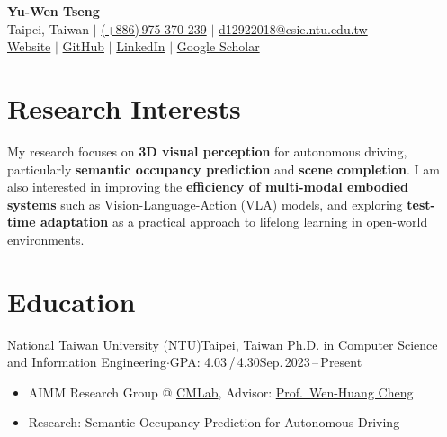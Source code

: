 \documentclass[10pt, a4paper]{article}
\begin{document}
\begin{center}
    {\LARGE\bfseries\color{primary} Yu-Wen Tseng}\vspace{4pt}\\
    {\small\color{lightgray}%
        \enspace Taipei, Taiwan \quad$\vert$\quad
        \enspace\href{tel:+886975370239}{(+886)\,975-370-239} \quad$\vert$\quad
        \enspace\href{mailto:d12922018@csie.ntu.edu.tw}{d12922018@csie.ntu.edu.tw}%
    }\vspace{2pt}\\
    {\small\color{lightgray}%
        \enspace\href{https://ywt0209.github.io}{Website} \quad$\vert$\quad
        \enspace\href{https://github.com/ywt0209}{GitHub} \quad$\vert$\quad
        \enspace\href{https://www.linkedin.com/in/yu-wen-tseng-840586343/}{LinkedIn} \quad$\vert$\quad
        \enspace\href{https://scholar.google.com/citations?user=3NGcUfcAAAAJ&hl=zh-TW}{Google Scholar}%
    }
\end{center}
\vspace{-6pt}

\section{Research Interests}
\vspace{3pt}
\small
My research focuses on \textbf{3D visual perception} for autonomous driving, particularly \textbf{semantic occupancy prediction} and \textbf{scene completion}. I am also interested in improving the \textbf{efficiency of multi-modal embodied systems} such as Vision-Language-Action (VLA) models, and exploring \textbf{test-time adaptation} as a practical approach to lifelong learning in open-world environments.

\section{Education}

\eduEntry
    {National Taiwan University (NTU)}{Taipei, Taiwan}
    {Ph.D. in Computer Science and Information Engineering\enspace$\cdot$\enspace GPA: 4.03\,/\,4.30}{Sep.\,2023\,--\,Present}
\begin{itemize}[leftmargin=1.4em, topsep=1pt, itemsep=0pt, parsep=0pt]
    \item\small AIMM Research Group @ \href{https://www.cmlab.csie.ntu.edu.tw/new_cml_website/index.php}{CMLab}, Advisor: \href{https://www.csie.ntu.edu.tw/~wenhuang/}{Prof.\ Wen-Huang Cheng}
    \item\small Research: Semantic Occupancy Prediction for Autonomous Driving
\end{itemize}
\end{document}
